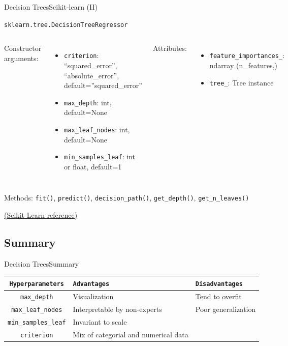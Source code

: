 \documentclass[10pt,compress]{beamer} %
\begin{document}
{\begin{frame}{Decision Trees}{Scikit-learn (II)}
\begin{exampleblock}{\texttt{sklearn.tree.DecisionTreeRegressor}}
         \begin{columns}[T]
                Constructor arguments:
                \begin{itemize}
                    \item \texttt{criterion}: {“squared\_error”, “absolute\_error”}, default=”squared\_error”
                    \item \texttt{max\_depth}: int, default=None
                    \item \texttt{max\_leaf\_nodes}: int, default=None
                    \item \texttt{min\_samples\_leaf}: int or float, default=1
                \end{itemize}

                Attributes:
                \begin{itemize}
                    \item \texttt{feature\_importances\_}: ndarray (n\_features,)
                    \item \texttt{tree\_}: Tree instance
                \end{itemize}
            \end{columns}

            \medskip

            Methods: \texttt{fit()}, \texttt{predict()}, \texttt{decision\_path()}, \texttt{get\_depth()}, \texttt{get\_n\_leaves()}
        \end{exampleblock}

        \medskip

        \centering \href{https://scikit-learn.org/stable/modules/generated/sklearn.tree.DecisionTreeRegressor.html}{(Scikit-Learn reference)}
    \end{frame}
}{}

\subsection{Summary}
\begin{frame}{Decision Trees}{Summary}
	\begin{center}
	\begin{tabular}{cp{3cm}p{3cm}}\hline
	 	\texttt{Hyperparameters}  & \texttt{Advantages}  & \texttt{Disadvantages} \\\hline
	 	\texttt{max\_depth}       & Visualization        & Tend to overfit  \\
	 	\texttt{max\_leaf\_nodes} & Interpretable by non-experts     & Poor generalization  \\
	 	\texttt{min\_samples\_leaf} & Invariant to scale     &   \\
	 	\texttt{criterion} & Mix of categorial and numerical data     &   \\
	 	\hline
	\end{tabular}
	\end{center}
\end{frame}
\end{document}
